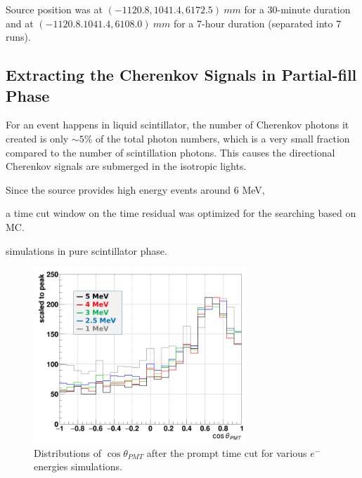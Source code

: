 Source position was at $(-1120.8, 1041.4, 6172.5)~ mm$ for a 30-minute duration and at $(-1120.8. 1041.4, 6108.0)~mm$ for a 7-hour duration (separated into 7 runs).





\subsection{Extracting the Cherenkov Signals in Partial-fill Phase}

For an event happens in liquid scintillator, the number of Cherenkov photons it created is only $\sim 5\%$ 
of the total photon numbers, which is a very small fraction compared to the number of scintillation photons. This causes the directional Cherenkov signals are submerged in the isotropic lights.

Since the  source provides high energy events around 6 MeV, 






a time cut window on the time residual was optimized for the searching based on MC.

simulations in pure scintillator phase.






 
\begin{figure}[!htb]
	\centering
	\includegraphics[width=8cm]{cherenkov_scint_variousE.png}
	\caption{Distributions of $\cos\theta_{PMT}$ after the prompt time cut for various $e^-$ energies simulations.}
	\label{cherenkov_variousE}
\end{figure}


